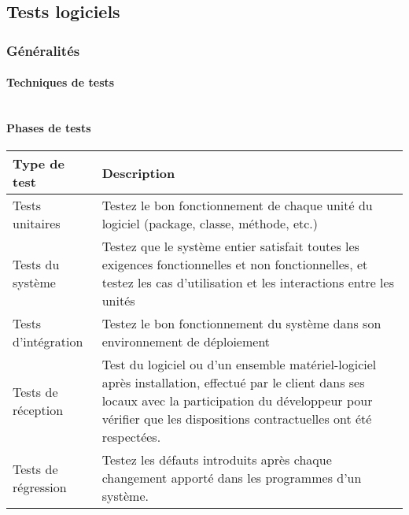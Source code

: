 \subsection{Tests logiciels}

\subsubsection{G\'en\'eralit\'es}
\paragraph{Techniques de tests}

\begin{table}[H]
	\begin{adjustbox}{max width=\textwidth}
		\begin{tabular}{l|l}
			
		\end{tabular}
	\end{adjustbox}
\end{table}
\paragraph{Phases de tests}

\begin{table}[H]
	\begin{adjustbox}{max width=\textwidth}
		\begin{tabular}{l|p{40em}}
			\toprule
			\textbf{Type de test} & \textbf{Description} \\
			\midrule
			Tests unitaires & Testez le bon fonctionnement de chaque unité du logiciel (package, classe, méthode, etc.) \\
			Tests du système & Testez que le système entier satisfait toutes les exigences fonctionnelles et non fonctionnelles, et testez les cas d'utilisation et les interactions entre les unités \\
			Tests d'intégration & Testez le bon fonctionnement du système dans son environnement de déploiement \\
			Tests de réception & Test du logiciel ou d'un ensemble matériel-logiciel après installation, effectué par le client dans ses locaux avec la participation du développeur pour vérifier que les dispositions contractuelles ont été respectées. \\
			Tests de régression & Testez les défauts introduits après chaque changement apporté dans les programmes d'un système.\\
			\bottomrule
		\end{tabular}
	\end{adjustbox}
\end{table}





